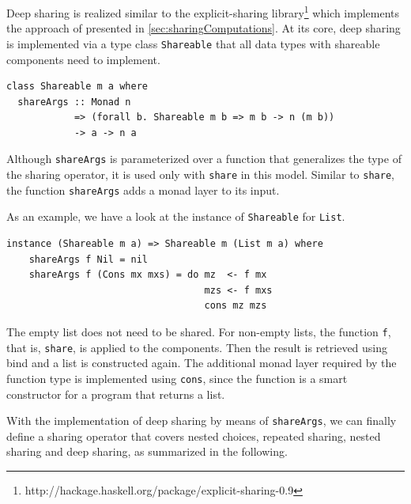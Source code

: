 \documentclass[a4paper, 11pt, fleqn, twoside, abstract=on]{scrreprt}
\newcommand{\hinl}[1]{\texttt{#1}}
\begin{document}
Deep sharing is realized similar to the explicit-sharing library\footnote{http://hackage.haskell.org/package/explicit-sharing-0.9} which implements the approach of \citet{fischer2009purely} presented in \autoref{sec:sharingComputations}.
At its core, deep sharing is implemented via a type class \hinl{Shareable} that all data types with shareable components need to implement.

\begin{verbatim}
class Shareable m a where
  shareArgs :: Monad n 
            => (forall b. Shareable m b => m b -> n (m b))
            -> a -> n a
\end{verbatim}
\noindent
Although \hinl{shareArgs} is parameterized over a function that generalizes the type of the sharing operator, it is used only with \hinl{share} in this model.
Similar to \hinl{share}, the function \hinl{shareArgs} adds a monad layer to its input.

As an example, we have a look at the instance of \hinl{Shareable} for \hinl{List}.

\begin{verbatim}
instance (Shareable m a) => Shareable m (List m a) where
    shareArgs f Nil = nil
    shareArgs f (Cons mx mxs) = do mz  <- f mx
                                   mzs <- f mxs
                                   cons mz mzs
\end{verbatim}
\noindent
The empty list does not need to be shared.
For non-empty lists, the function \hinl{f}, that is, \hinl{share}, is applied to the components.
Then the result is retrieved using bind and a list is constructed again.
The additional monad layer required by the function type is implemented using \hinl{cons}, since the function is a smart constructor for a program that returns a list.


With the implementation of deep sharing by means of \hinl{shareArgs}, we can finally define a sharing operator that covers nested choices, repeated sharing, nested sharing and deep sharing, as summarized in the following.
\end{document}
